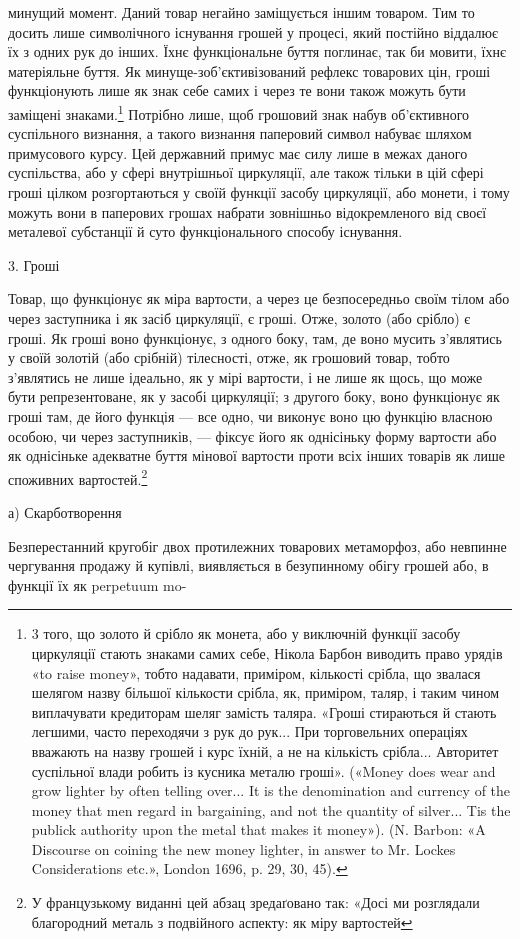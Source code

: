 минущий момент. Даний товар негайно заміщується іншим товаром.
Тим то досить лише символічного існування грошей у процесі,
який постійно віддалює їх з одних рук до інших. Їхнє функціональне
буття поглинає, так би мовити, їхнє матеріяльне буття.
Як минуще-зоб’єктивізований рефлекс товарових цін, гроші
функціонують лише як знак себе самих і через те вони також
можуть бути заміщені знаками.\footnote{
3 того, що золото й срібло як монета, або у виключній функції
засобу циркуляції стають знаками самих себе, Нікола Барбон виводить
право урядів «to raise money», тобто надавати, приміром, кількості срібла,
що звалася шелягом назву більшої кількости срібла, як, приміром, таляр,
і таким чином виплачувати кредиторам шеляг замість таляра. «Гроші
стираються й стають легшими, часто переходячи з рук до рук... При торговельних
операціях вважають на назву грошей і курс їхній, а не на кількість
срібла... Авторитет суспільної влади робить із кусника металю
гроші». («Money does wear and grow lighter by often telling over... It is
the denomination and currency of the money that men regard in bargaining,
and not the quantity of silver... Tis the publick authority upon the metal
that makes it money»). (N. Barbon: «A Discourse on coining the new
money lighter, in answer to Mr. Lockes Considerations etc.», London 1696,
p. 29, 30, 45).
} Потрібно лише, щоб грошовий
знак набув об’єктивного суспільного визнання, а такого визнання
паперовий символ набуває шляхом примусового курсу. Цей
державний примус має силу лише в межах даного суспільства,
або у сфері внутрішньої циркуляції, але також тільки в цій
сфері гроші цілком розгортаються у своїй функції засобу циркуляції,
або монети, і тому можуть вони в паперових грошах набрати
зовнішньо відокремленого від своєї металевої субстанції й суто
функціонального способу існування.

3. Гроші

Товар, що функціонує як міра вартости, а через це безпосередньо
своїм тілом або через заступника і як засіб циркуляції,
є гроші. Отже, золото (або срібло) є гроші. Як гроші воно функціонує,
з одного боку, там, де воно мусить з’являтись у своїй
золотій (або срібній) тілесності, отже, як грошовий товар, тобто
з’являтись не лише ідеально, як у мірі вартости, і не лише як
щось, що може бути репрезентоване, як у засобі циркуляції;
з другого боку, воно функціонує як гроші там, де його функція —
все одно, чи виконує воно цю функцію власною особою, чи через
заступників, — фіксує його як однісіньку форму вартости або як
однісіньке адекватне буття мінової вартости проти всіх інших
товарів як лише споживних вартостей.\footnote*{
У французькому виданні цей абзац зредаґовано так: «Досі ми розглядали
благородний металь з подвійного аспекту: як міру вартостей
}

а) Скарботворення

Безперестанний кругобіг двох протилежних товарових метаморфоз,
або невпинне чергування продажу й купівлі, виявляється
в безупинному обігу грошей або, в функції їх як perpetuum mo-